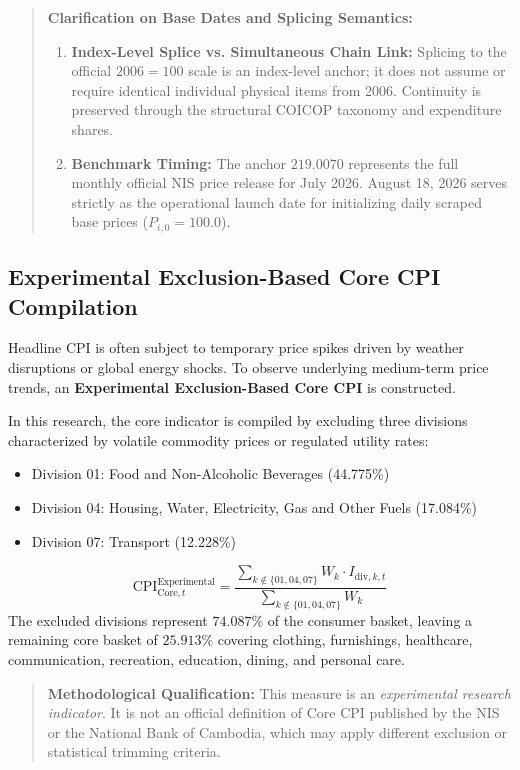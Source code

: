 \begin{quote}
\textbf{Clarification on Base Dates and Splicing Semantics:}
\begin{enumerate}
    \item \textbf{Index-Level Splice vs. Simultaneous Chain Link:} Splicing to the official $2006=100$ scale is an index-level anchor; it does not assume or require identical individual physical items from 2006. Continuity is preserved through the structural COICOP taxonomy and expenditure shares.
    \item \textbf{Benchmark Timing:} The anchor $219.0070$ represents the full monthly official NIS price release for July 2026. August 18, 2026 serves strictly as the operational launch date for initializing daily scraped base prices ($P_{i, 0} = 100.0$).
\end{enumerate}
\end{quote}

\subsection{Experimental Exclusion-Based Core CPI Compilation}
\hs Headline CPI is often subject to temporary price spikes driven by weather disruptions or global energy shocks. To observe underlying medium-term price trends, an \textbf{Experimental Exclusion-Based Core CPI} is constructed.

In this research, the core indicator is compiled by excluding three divisions characterized by volatile commodity prices or regulated utility rates:
\begin{itemize}
    \item Division 01: Food and Non-Alcoholic Beverages (44.775\%)
    \item Division 04: Housing, Water, Electricity, Gas and Other Fuels (17.084\%)
    \item Division 07: Transport (12.228\%)
\end{itemize}
\begin{equation}
    \text{CPI}_{\text{Core}, t}^{\text{Experimental}} = \frac{\sum_{k \notin \{01, 04, 07\}} W_k \cdot I_{\text{div}, k, t}}{\sum_{k \notin \{01, 04, 07\}} W_k}
\end{equation}
The excluded divisions represent $74.087\%$ of the consumer basket, leaving a remaining core basket of $25.913\%$ covering clothing, furnishings, healthcare, communication, recreation, education, dining, and personal care.

\begin{quote}
\textbf{Methodological Qualification:} This measure is an \textit{experimental research indicator}. It is not an official definition of Core CPI published by the NIS or the National Bank of Cambodia, which may apply different exclusion or statistical trimming criteria.
\end{quote}

